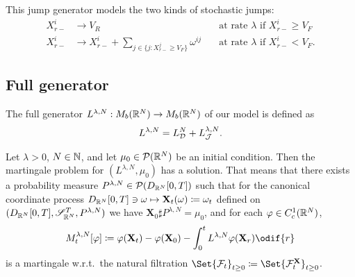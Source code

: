 This jump generator models the two kinds of stochastic jumps:
\begin{align}
  X_{r-}^i & \to V_R                                                           & \quad\text{at rate } \lambda \text{ if } X_{r-}^i \geq V_F \\
  X_{r-}^i & \to X_{r-}^i + \sum_{j \in \{j : X_{r-}^j \geq V_F\}} \omega^{ij} & \quad\text{at rate } \lambda \text{ if } X_{r-}^i < V_F.
\end{align}


\subsection{Full generator}

The full generator \(L^{\lambda, N} : M_b(\mathbb{R}^N) \to M_b(\mathbb{R}^N)\) of our model is defined as
\begin{equation}
  L^{\lambda, N} = L_{\mathcal{D}}^{N} + L_{\mathcal{J}}^{\lambda, N}.
\end{equation}


\begin{theorem}\label{thm:mart-problem-sol}
  Let \(\lambda > 0\), \( N \in \mathbb{N} \), and let \(\mu_0 \in \mathcal{P}(\mathbb{R}^N)\) be an initial condition.
  Then the martingale problem for \((L^{\lambda, N}, \mu_0)\) has a solution. %
  That means that there exists a probability measure \(P^{\lambda, N} \in \mathcal{P}(D_{\mathbb{R}^N}[0,T])\) such that for the canonical coordinate process \(D_{\mathbb{R}^N}[0,T] \ni \mathbf{\omega} \mapsto \mathbf{X}_t(\mathbf{\omega}) \coloneqq \mathbf{\omega}_t\) defined on \((D_{\mathbb{R}^N}[0,T], \mathscr{S}_{\mathbb{R}^N}^T, P^{\lambda, N})\) we have \( \bm{X}_0 \sharp P^{\lambda, N} = \mu_0 \), and for each \(\varphi \in C_c^1(\mathbb{R}^N)\), %
  \begin{equation}\label{eq:M-def}
    M_t^{\lambda, N}[\varphi]
    \coloneqq \varphi(\bm{X}_t) - \varphi(\bm{X}_0) - \int_0^t L^{\lambda, N} \varphi(\bm{X}_r) \odif{r}
  \end{equation}
  is a martingale w.r.t.\ the natural filtration \(\Set{\cF_t}_{t\geq0} \coloneqq \Set{\cF_t^\bm{X}}_{t\geq0}\).    %
\end{theorem}

